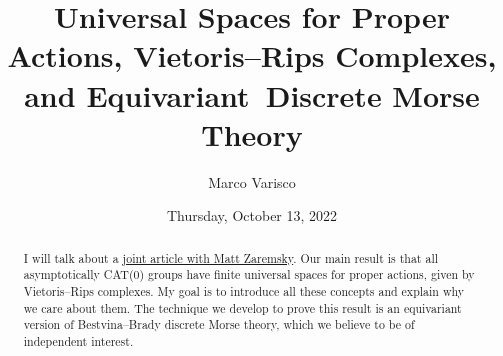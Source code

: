 \documentclass{UAmathtalk}
\author{Marco Varisco}
\title{Universal Spaces for Proper Actions, Vietoris--Rips Complexes, and Equivariant~Discrete Morse Theory}
\date{Thursday, October 13, 2022}
\begin{document}
\maketitle

\begin{abstract}
I will talk about a \href{https://doi.org/10.1112/blms.12534}{joint article with Matt Zaremsky}.
Our main result is that all asymptotically CAT(0) groups have finite universal spaces for proper actions, given by Vietoris--Rips complexes.
My goal is to introduce all these concepts and explain why we care about them.
The technique we develop to prove this result is an equivariant version of Bestvina--Brady discrete Morse theory, which we believe to be of independent interest.
\end{abstract}
\end{document}
